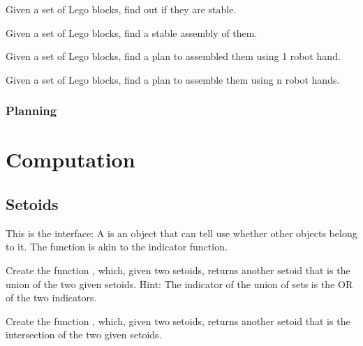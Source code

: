 \begin{exercise}
  Given a set of Lego blocks, find out if they are stable.
\end{exercise}

\begin{exercise}
  Given a set of Lego blocks, find a stable assembly of them.
\end{exercise}

\begin{exercise}
  Given a set of Lego blocks, find a plan to assembled them using 1 robot hand.
\end{exercise}

\begin{exercise}
  Given a set of Lego blocks, find a plan to assemble them using n robot hands.
\end{exercise}

\subsection{Planning}



\chapter{Computation}


\section{Setoids}

This is the \Setoid interface:
%
%
A \Setoid is an object that can tell use whether other objects belong to it.
The  function is akin to the indicator function.


\begin{exercise}
  Create the function , which, given two setoids, returns another setoid that is the union of the two given setoids.
%
%
  Hint: The indicator of the union of sets is the OR of the two indicators.
\end{exercise}

\begin{exercise}
  Create the function , which, given two setoids, returns another setoid that is the intersection of the two given setoids.
%
\end{exercise}


